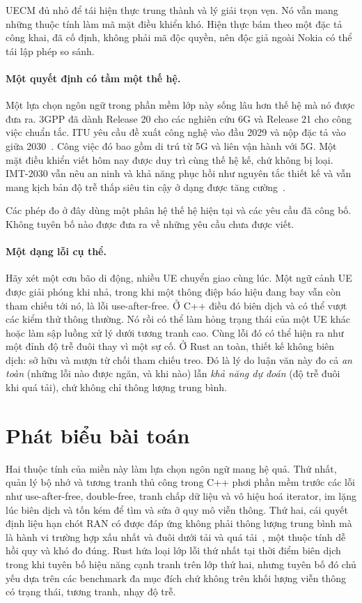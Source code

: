 UECM đủ nhỏ để tái hiện thực trung thành và lý giải trọn vẹn. Nó vẫn mang những thuộc tính làm
mã mặt điều khiển khó. Hiện thực bám theo một đặc tả công khai, đã cố định, không phải mã độc
quyền, nên độc giả ngoài Nokia có thể tái lập phép so sánh.

\paragraph{Một quyết định có tầm một thế hệ.}
Một lựa chọn ngôn ngữ trong phần mềm lớp này sống lâu hơn thế hệ mà nó được đưa ra. 3GPP đã
dành Release 20 cho các nghiên cứu 6G và Release 21 cho công việc chuẩn tắc. ITU yêu cầu đề
xuất công nghệ vào đầu 2029 và nộp đặc tả vào giữa 2030~\cite{3gpp2024road6g}. Công việc đó
bao gồm di trú từ 5G và liên vận hành với 5G. Một mặt điều khiển viết hôm nay được duy trì
cùng thế hệ kế, chứ không bị loại. IMT-2030 vẫn nêu an ninh và khả năng phục hồi như nguyên
tắc thiết kế và vẫn mang kịch bản độ trễ thấp siêu tin cậy ở dạng được tăng
cường~\cite{itu2023imt2030}.

Các phép đo ở đây dùng một phân hệ thế hệ hiện tại và các yêu cầu đã công bố. Không tuyên bố
nào được đưa ra về những yêu cầu chưa được viết.

\paragraph{Một dạng lỗi cụ thể.}
Hãy xét một cơn bão di động, nhiều UE chuyển giao cùng lúc. Một ngữ cảnh UE được giải phóng
khi nhả, trong khi một thông điệp báo hiệu đang bay vẫn còn tham chiếu tới nó, là lỗi
use-after-free. Ở C++ điều đó biên dịch và có thể vượt các kiểm thử thông thường. Nó rồi có
thể làm hỏng trạng thái của một UE khác hoặc làm sập luồng xử lý dưới tương tranh cao. Cùng
lỗi đó có thể hiện ra như một đỉnh độ trễ đuôi thay vì một sự cố. Ở Rust an toàn, thiết kế
không biên dịch: sở hữu và mượn từ chối tham chiếu treo. Đó là lý do luận văn này đo cả
\emph{an toàn} (những lỗi nào được ngăn, và khi nào) lẫn \emph{khả năng dự đoán} (độ trễ đuôi
khi quá tải), chứ không chỉ thông lượng trung bình.

\section{Phát biểu bài toán}
Hai thuộc tính của miền này làm lựa chọn ngôn ngữ mang hệ quả. Thứ nhất, quản lý bộ nhớ và
tương tranh thủ công trong C++ phơi phần mềm trước các lỗi như use-after-free, double-free,
tranh chấp dữ liệu và vô hiệu hoá iterator, im lặng lúc biên dịch và tốn kém để tìm và sửa ở
quy mô viễn thông. Thứ hai, cái quyết định liệu hạn chót RAN có được đáp ứng không phải thông
lượng trung bình mà là hành vi trường hợp xấu nhất và đuôi dưới tải và quá
tải~\cite{dean2013tail}, một thuộc tính dễ hồi quy và khó đo đúng. Rust hứa loại lớp lỗi thứ
nhất tại thời điểm biên dịch trong khi tuyên bố hiệu năng cạnh tranh trên lớp thứ hai, nhưng
tuyên bố đó chủ yếu dựa trên các benchmark đa mục đích chứ không trên khối lượng viễn thông
có trạng thái, tương tranh, nhạy độ trễ.

